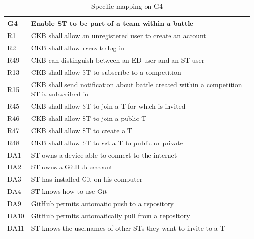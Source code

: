   \begin{table}[H]
    \begin{longtable}{|l|p{12cm}|}
      \hline
      \textbf{G4} & \textbf{Enable ST to be part of a team within a battle}      \\
      \hline
      R1 & CKB shall allow an unregistered user to create an account \\
      \hline
      R2 & CKB shall allow users to log in \\
      \hline
      R49 & CKB can distinguish between an ED user and an ST user \\
      \hline
      R13 & CKB shall allow ST to subscribe to a competition \\
      \hline
      R15 & CKB shall send notification about battle created within a competition ST is subscribed in \\
      \hline
      R45 & CKB shall allow ST to join a T for which is invited \\
      \hline
      R46 & CKB shall allow ST to join a public T \\
      \hline
      R47 & CKB shall allow ST to create a T \\
      \hline
      R48 & CKB shall allow ST to set a T to public or private \\
      \hline
      DA1 & ST owns a device able to connect to the internet \\
      \hline
      DA2 & ST owns a GitHub account \\
      \hline
      DA3 & ST has installed Git on his computer \\
      \hline
      DA4 & ST knows how to use Git \\
      \hline
      DA9 & GitHub permits automatic push to a repository \\
      \hline
      DA10 & GitHub permits automatically pull from a repository \\
      \hline
      DA11 & ST knows the usernames of other STs they want to invite to a T \\
      \hline
    \end{longtable}
    \caption{Specific mapping on G4}
    \label{tab:mappingG4}
  \end{table}

